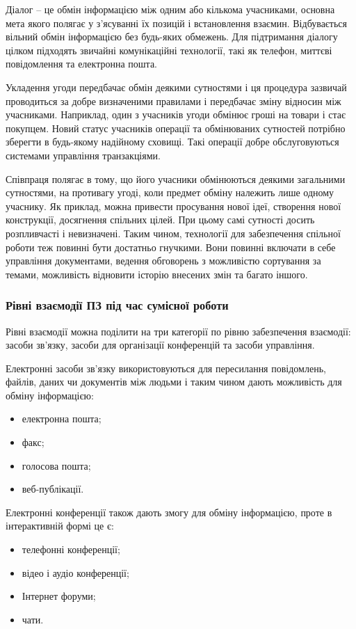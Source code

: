\par Діалог -- це обмін інформацією між одним або кількома учасниками, основна мета якого полягає у з'ясуванні їх позицій і встановлення взаємин. 
Відбувається вільний обмін інформацією без будь-яких обмежень. 
Для підтримання діалогу цілком підходять звичайні комунікаційні технології, такі як телефон, миттєві повідомлення та електронна пошта.
\par Укладення угоди передбачає обмін деякими сутностями і ця процедура зазвичай проводиться за добре визначеними правилами і передбачає зміну відносин між учасниками. Наприклад, один з учасників угоди обмінює гроші на товари і стає покупцем. Новий статус учасників операції та обмінюваних сутностей потрібно зберегти в будь-якому надійному сховищі. Такі операції добре обслуговуються системами управління транзакціями. 
\par Співпраця полягає в тому, що його учасники обмінюються деякими загальними сутностями, на противагу угоді, коли предмет обміну належить лише одному учаснику. 
Як приклад, можна привести просування нової ідеї, створення нової конструкції, досягнення спільних цілей. 
При цьому самі сутності досить розпливчасті і невизначені. 
Таким чином, технології для забезпечення спільної роботи теж повинні бути достатньо гнучкими. 
Вони повинні включати в себе управління документами, ведення обговорень з можливістю сортування за темами, можливість відновити історію внесених змін та багато іншого.
 
\subsubsection{Рівні взаємодії ПЗ під час сумісної роботи}

Рівні взаємодії можна поділити на три категорії по рівню забезпечення взаємодії: засоби зв'язку, засоби для організації конференцій та засоби управління.

\par Електронні засоби зв'язку використовуються для пересилання повідомлень, файлів, даних чи документів між людьми і таким чином дають можливість для обміну інформацією:
\begin{itemize}
\item електронна пошта;
\item факс;
\item голосова пошта;
\item веб-публікації.
\end{itemize}

Електронні конференції також дають змогу для обміну інформацією, проте в інтерактивній формі це є:
\begin{itemize}
\item телефонні конференції;
\item відео і аудіо конференції;
\item Інтернет форуми;
\item чати.
\end{itemize}

